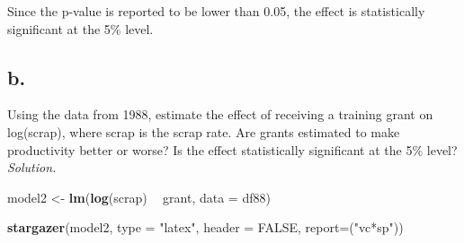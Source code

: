 \documentclass[
]{article}
\newenvironment{Shaded}{\begin{snugshade}}{\end{snugshade}}
\newcommand{\DataTypeTok}[1]{\textcolor[rgb]{0.13,0.29,0.53}{#1}}
\newcommand{\KeywordTok}[1]{\textcolor[rgb]{0.13,0.29,0.53}{\textbf{#1}}}
\newcommand{\NormalTok}[1]{#1}
\newcommand{\OperatorTok}[1]{\textcolor[rgb]{0.81,0.36,0.00}{\textbf{#1}}}
\newcommand{\OtherTok}[1]{\textcolor[rgb]{0.56,0.35,0.01}{#1}}
\newcommand{\StringTok}[1]{\textcolor[rgb]{0.31,0.60,0.02}{#1}}
\begin{document}
Since the p-value is reported to be lower than 0.05, the effect is
statistically significant at the 5\(\%\) level.

\hypertarget{b.}{%
\subsection{b.}\label{b.}}

Using the data from 1988, estimate the effect of receiving a training
grant on log(scrap), where scrap is the scrap rate. Are grants estimated
to make productivity better or worse? Is the effect statistically
significant at the 5\% level? \newline \newline \emph{Solution.}

\begin{Shaded}
\begin{Highlighting}[]
\NormalTok{model2 <-}\StringTok{ }\KeywordTok{lm}\NormalTok{(}\KeywordTok{log}\NormalTok{(scrap) }\OperatorTok{~}\StringTok{ }\NormalTok{grant, }\DataTypeTok{data =}\NormalTok{ df88)}
\end{Highlighting}
\end{Shaded}

\begin{Shaded}
\begin{Highlighting}[]
\KeywordTok{stargazer}\NormalTok{(model2, }\DataTypeTok{type =} \StringTok{"latex"}\NormalTok{, }\DataTypeTok{header =} \OtherTok{FALSE}\NormalTok{, }\DataTypeTok{report=}\NormalTok{(}\StringTok{"vc*sp"}\NormalTok{))}
\end{Highlighting}
\end{Shaded}
\end{document}
